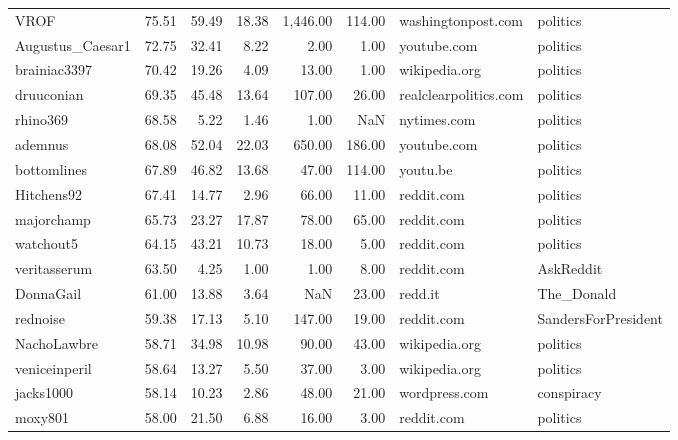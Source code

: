 \begin{tabular}{lrrrrrll}
VROF             &       75.51 &     59.49 &      18.38 &    1,446.00 &      114.00 &     washingtonpost.com &             politics \\
Augustus\_Caesar1 &       72.75 &     32.41 &       8.22 &        2.00 &        1.00 &            youtube.com &             politics \\
brainiac3397     &       70.42 &     19.26 &       4.09 &       13.00 &        1.00 &          wikipedia.org &             politics \\
druuconian       &       69.35 &     45.48 &      13.64 &      107.00 &       26.00 &  realclearpolitics.com &             politics \\
rhino369         &       68.58 &      5.22 &       1.46 &        1.00 &         NaN &            nytimes.com &             politics \\
ademnus          &       68.08 &     52.04 &      22.03 &      650.00 &      186.00 &            youtube.com &             politics \\
bottomlines      &       67.89 &     46.82 &      13.68 &       47.00 &      114.00 &               youtu.be &             politics \\
Hitchens92       &       67.41 &     14.77 &       2.96 &       66.00 &       11.00 &             reddit.com &             politics \\
majorchamp       &       65.73 &     23.27 &      17.87 &       78.00 &       65.00 &             reddit.com &             politics \\
watchout5        &       64.15 &     43.21 &      10.73 &       18.00 &        5.00 &             reddit.com &             politics \\
veritasserum     &       63.50 &      4.25 &       1.00 &        1.00 &        8.00 &             reddit.com &            AskReddit \\
DonnaGail        &       61.00 &     13.88 &       3.64 &         NaN &       23.00 &                redd.it &           The\_Donald \\
rednoise         &       59.38 &     17.13 &       5.10 &      147.00 &       19.00 &             reddit.com &  SandersForPresident \\
NachoLawbre      &       58.71 &     34.98 &      10.98 &       90.00 &       43.00 &          wikipedia.org &             politics \\
veniceinperil    &       58.64 &     13.27 &       5.50 &       37.00 &        3.00 &          wikipedia.org &             politics \\
jacks1000        &       58.14 &     10.23 &       2.86 &       48.00 &       21.00 &          wordpress.com &           conspiracy \\
moxy801          &       58.00 &     21.50 &       6.88 &       16.00 &        3.00 &             reddit.com &             politics \\
\bottomrule
\end{tabular}
